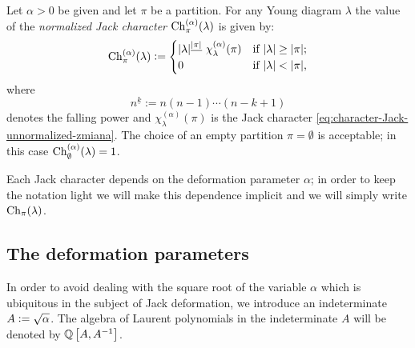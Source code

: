 \documentclass[12pt,usenames,dvipsnames,svgnames,table]{amsart}
\begin{document}
\begin{definition}
	\label{def:jack-character-classical}
	Let $\alpha>0$ be given and let $\pi$ be a partition. 
	For any Young diagram $\lambda$ the value of 
	the \emph{normalized Jack character $\operatorname{Ch}_\pi^{(\alpha)}(\lambda)$} is given by:
	\begin{equation}
	\label{eq:what-is-jack-character-zmiana}
	\operatorname{Ch}_{\pi}^{(\alpha)}(\lambda):=
	\begin{cases}
	|\lambda|^{\underline{|\pi|}}\ \chi^{(\alpha)}_\lambda(\pi)
	&\text{if }|\lambda| \ge |\pi| ;\\
	0 & \text{if }|\lambda| < |\pi|,
	\end{cases}
	\end{equation}
	where 
	\[ n^{\underline{k}}:=n (n-1) \cdots (n-k+1)\]
	denotes the falling power and $\chi^{(\alpha)}_\lambda(\pi)$ is the Jack character
	\eqref{eq:character-Jack-unnormalized-zmiana}.
	The choice of an empty partition $\pi=\emptyset$ is acceptable; in this case
	$\operatorname{Ch}_\emptyset^{(\alpha)}(\lambda)=1$.
\end{definition}

Each Jack character depends on the deformation parameter $\alpha$; 
in order to keep the notation light we will make this dependence implicit
and we will simply write $\operatorname{Ch}_{\pi}(\lambda)$.

\subsection{The deformation parameters}
In order to avoid dealing with the square root of the variable $\alpha$
which is ubiquitous in the subject of Jack deformation,
we introduce an indeterminate $A := \sqrt{\alpha}$.
The algebra of Laurent polynomials in the indeterminate $A$ will be denoted by $\mathbb{Q}\left[A,A^{-1}\right]$.
\end{document}
